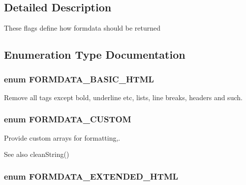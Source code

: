 \subsection{Detailed Description}
These flags define how formdata should be returned 

\subsection{Enumeration Type Documentation}
\subsubsection[{FORMDATA\_\-BASIC\_\-HTML}]{\setlength{\rightskip}{0pt plus 5cm}enum {\bf FORMDATA\_\-BASIC\_\-HTML}}\label{group__FORM__ParseFlags_ga274bb2c8e23d075b189f143adbb6746e}


Remove all tags except bold, underline etc, lists, line breaks, headers and such. 

\subsubsection[{FORMDATA\_\-CUSTOM}]{\setlength{\rightskip}{0pt plus 5cm}enum {\bf FORMDATA\_\-CUSTOM}}\label{group__FORM__ParseFlags_gae5bb66ec27c03f3b03796f3bd80ba2ff}


Provide custom arrays for formatting,. 

\begin{DoxySeeAlso}{See also}
cleanString() 
\end{DoxySeeAlso}
\subsubsection[{FORMDATA\_\-EXTENDED\_\-HTML}]{\setlength{\rightskip}{0pt plus 5cm}enum {\bf FORMDATA\_\-EXTENDED\_\-HTML}}\label{group__FORM__ParseFlags_gac2f81495783870a3c4a63ab0164aa412}



